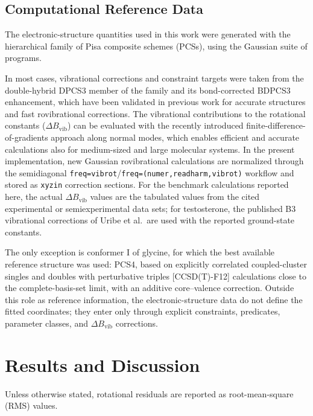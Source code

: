 \documentclass[aip,jcp,reprint,longbibliography,floatfix]{revtex4-2}
\begin{document}
\subsection{Computational Reference Data}

The electronic-structure quantities used in this work were generated with the
hierarchical family of Pisa composite schemes (PCSs),\cite{pcs1234_2024,Lazzari2025LCB25}
using the Gaussian suite of programs.\cite{g16}

In most cases, vibrational corrections and constraint targets were taken from
the double-hybrid DPCS3 member of the family and its bond-corrected BDPCS3 enhancement,
which have been validated in previous work for accurate structures and fast rovibrational corrections.\cite{wires_2025,Mendolicchio2025FastDvib,acr_2026}
The vibrational contributions to the rotational constants
($\Delta B_\mathrm{vib}$) can be evaluated with the recently introduced
finite-difference-of-gradients approach along normal modes, which enables
efficient and accurate calculations also for medium-sized and large molecular
systems.\cite{Mendolicchio2025FastDvib} In the present implementation,
new Gaussian rovibrational calculations are normalized through the
semidiagonal \texttt{freq=vibrot}/\texttt{freq=(numer,readharm,vibrot)}
workflow and stored as \texttt{xyzin} correction sections. For the benchmark
calculations reported here, the actual $\Delta B_\mathrm{vib}$ values are the
tabulated values from the cited experimental or semiexperimental data sets;
for testosterone, the published B3 vibrational corrections of
Uribe et al.\ are used with the reported ground-state constants.

The only exception is conformer I of glycine, for which the best available
reference structure was used: PCS4, based on explicitly correlated coupled-cluster
singles and doubles with perturbative triples [CCSD(T)-F12] calculations close
to the complete-basis-set limit, with an additive core--valence correction.
Outside this role as reference information, the electronic-structure
data do not define the fitted coordinates; they enter only through explicit
constraints, predicates, parameter classes, and $\Delta B_\mathrm{vib}$
corrections.


\section{Results and Discussion}

Unless otherwise stated, rotational residuals are reported as
root-mean-square (RMS) values.
\end{document}
